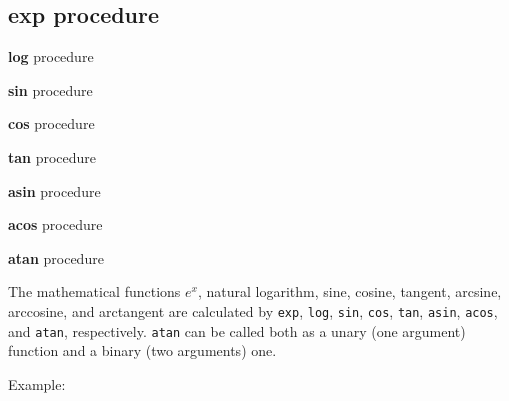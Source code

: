 \documentclass[twoside,9pt]{report}
\begin{document}
\subsection{exp procedure}
\label{exp-procedure}


\textbf{log} procedure


\textbf{sin} procedure


\textbf{cos} procedure


\textbf{tan} procedure


\textbf{asin} procedure


\textbf{acos} procedure


\textbf{atan} procedure


The mathematical functions ${e}^{x}$, natural logarithm, sine, cosine, tangent, arcsine, arccosine, and arctangent are calculated by \texttt{exp}, \texttt{log}, \texttt{sin}, \texttt{cos}, \texttt{tan}, \texttt{asin}, \texttt{acos}, and \texttt{atan}, respectively. \texttt{atan} can be called both as a unary (one argument) function and a binary (two arguments) one.



Example:
\end{document}
